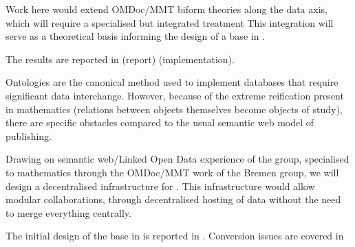 \begin{workpackage}[id=dksbases,%
  title=Data/Knowledge/Software-Bases,lead=JU,
  ZHRM=12,JURM=46,UWRM=25,SARM=10,LLRM=2,PSRM=4]
\begin{tasklist}
\begin{task}[title=Triform Theories in OMDoc/MMT,id=data-triform,
  lead=JU,partners={ZH},PM=12,wphases=0-12]
  Work here would extend OMDoc/MMT biform theories along the data axis, which will require
  a specialised but integrated treatment This integration will serve as a theoretical
  basis informing the design of a \DKS base in .

  The results are reported in  (report) 
  (implementation).
\end{task}

\begin{task}[id=data-design,lead=JU,partners={ZH,US,SA,UW,LL},wphases={6-12,15-18!.33},PM=12,
  title={\DKS Base Design}]
  Ontologies are the canonical method used to implement databases that require significant
  data interchange. However, because of the extreme reification present in mathematics
  (relations between objects themselves become objects of study), there are specific
  obstacles compared to the usual semantic web model of publishing.

  Drawing on semantic web/Linked Open Data experience of the  group, specialised
  to mathematics through the OMDoc/MMT work of the Bremen group, we will design a
  decentralised infrastructure for \TheProject. This infrastructure would allow modular
  collaborations, through decentralised hosting of data without the need to merge
  everything centrally.
  
  The initial design of the \DKS base in \TheProject is reported in
  . Conversion issues are covered in 
\end{task}

\begin{task}[title=Computational Foundation for Python/Sage,
  id=data-foundationCAS,lead=JU,partners={ZH,SA},PM=9,wphases=6-18!.66]


\end{task}
\end{tasklist}
\end{workpackage}
